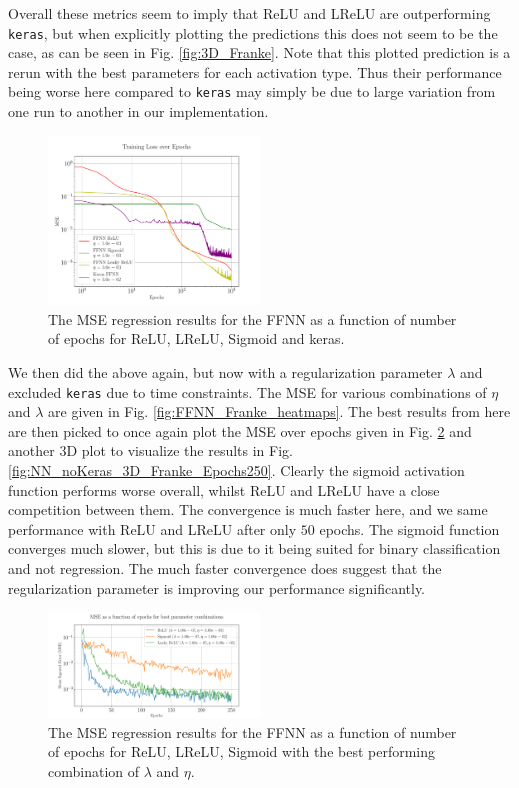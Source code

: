 \documentclass[%
reprint,s
amsmath,amssymb,
aps,
]{revtex4-2}
\begin{document}
Overall these metrics seem to imply that ReLU and LReLU are outperforming \texttt{keras}, but when explicitly plotting the predictions this does not seem to be the case, as can be seen in Fig. \ref{fig:3D_Franke}. Note that this plotted prediction is a rerun with the best parameters for each activation type. Thus their performance being worse here compared to \texttt{keras} may simply be due to large variation from one run to another in our implementation.
\begin{figure}[ht!]
	\includegraphics[width=0.5\textwidth]{Python/Figures/NN_MSE_Franke_Epoch.pdf}
	\caption{The MSE regression results for the FFNN as a function of number of epochs for ReLU, LReLU, Sigmoid and keras.}
	\label{fig:NN_Franke_Epochs}
\end{figure}

We then did the above again, but now with a regularization parameter $\lambda$ and excluded \texttt{keras} due to time constraints. The MSE for various combinations of $\eta$ and $\lambda$ are given in Fig. \ref{fig:FFNN_Franke_heatmaps}. The best results from here are then picked to once again plot the MSE over epochs given in Fig. \ref{fig:best_MSE_Franke_Epochs} and another 3D plot to visualize the results in Fig. \ref{fig:NN_noKeras_3D_Franke_Epochs250}. Clearly the sigmoid activation function performs worse overall, whilst ReLU and LReLU have a close competition between them. The convergence is much faster here, and we same performance with ReLU and LReLU after only $50$ epochs. The sigmoid function converges much slower, but this is due to it being suited for binary classification and not regression. The much faster convergence does suggest that the regularization parameter is improving our performance significantly.
\begin{figure}[ht!]
	\includegraphics[width=0.5\textwidth]{Python/Figures/Best_MSE_vs_Epochs250.pdf}
	\caption{The MSE regression results for the FFNN as a function of number of epochs for ReLU, LReLU, Sigmoid with the best performing combination of $\lambda$ and $\eta$.}
	\label{fig:best_MSE_Franke_Epochs}
\end{figure}
\end{document}
